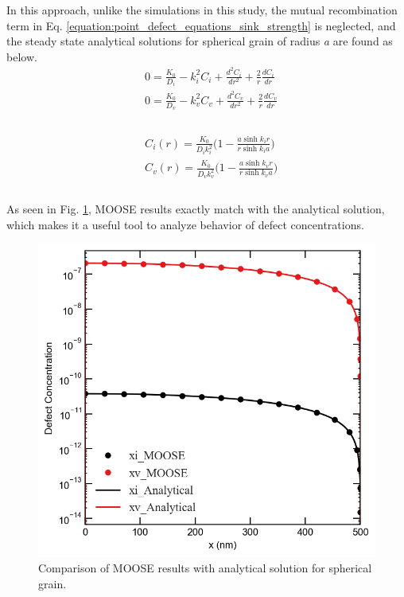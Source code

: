 \documentclass[a4paper]{article}
\begin{document}
  In this approach, unlike the simulations in this study, the mutual recombination term in Eq. \ref{equation:point_defect_equations_sink_strength} is neglected, and the steady state analytical solutions for spherical grain of radius \textit{a} are found as below.\cite{heald1977}\\

  \begin{equation}
    \begin{aligned}
      &0 = \frac{K_0}{D_i} - k_i^2C_i + \frac{d^2C_i}{dr^2}+\frac{2}{r}\frac{dC_i}{dr}\\
      &0 = \frac{K_0}{D_v} - k_v^2C_v + \frac{d^2C_v}{dr^2}+\frac{2}{r}\frac{dC_v}{dr}\\
    \end{aligned}
    \label{equation:spherical_norecomb_point_defect_equations}
  \end{equation}\\
  \begin{equation}
    \begin{aligned}
      &C_i(r)=\frac{K_0}{D_ik_i^2}\bigg(1-\frac{a\sinh{k_ir}}{r\sinh{k_ia}}\bigg)\\
      &C_v(r)=\frac{K_0}{D_vk_v^2}\bigg(1-\frac{a\sinh{k_vr}}{r\sinh{k_va}}\bigg)\\
    \end{aligned}
    \label{equation:spherical_grain_analytical_solution}
  \end{equation}\\

  As seen in Fig. \ref{figure:concentrations_MOOSE_analytical}, MOOSE results exactly match with the analytical solution, which makes it a useful tool to analyze behavior of defect concentrations.
  \begin{figure}[h!]
    \centering
    \includegraphics[scale=0.55]{concentration_profiles_MOOSE_Analytical_Neutron_0}
    \caption{Comparison of MOOSE results with analytical solution for spherical grain.}
    \label{figure:concentrations_MOOSE_analytical}
  \end{figure}
  \newpage
\end{document}
